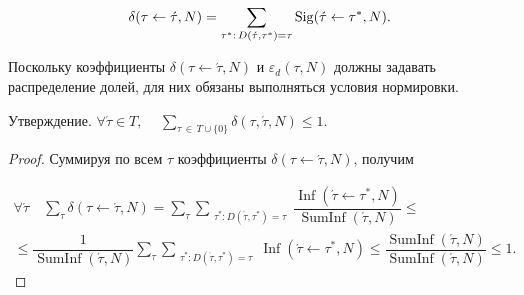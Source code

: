\begin{equation} \label{nazarov:coarse:delta_eq13}

	\delta(\tau\leftarrow\acute{\tau},N) = \sum_{\tau^{*}: \, D(\acute{\tau},\tau^{*})=\tau}  \mathop{\rm Sig}(\acute{\tau} \leftarrow \tau^{*},N).

\end{equation}

%

Поскольку коэффициенты $\delta(\tau\leftarrow\acute{\tau},N)$  и $\varepsilon_{d}(\tau,N)$ должны задавать распределение долей, для них обязаны выполняться условия нормировки. 



\smallskip



{\small\sc Утверждение.} $\forall \acute{\tau} \in T, \, \quad \sum\limits_{\tau \, \in \, T \cup \lbrace  0 \rbrace } \delta(\tau,\acute{\tau},N) \leq 1$.



\smallskip



\begin{proof}

  Суммируя по всем $\tau$  коэффициенты $\delta(\tau\leftarrow\acute{\tau},N)$,   получим

\begin{multline}

  \forall \acute{\tau} \quad

   \sum_{\tau} \delta(\tau\leftarrow\acute{\tau},N)  =

   \sum_{\tau}  \sum_{\substack{\tau^{*}: D(\acute{\tau},\tau^{*})=\tau}} 

\dfrac{\operatorname{Inf}(\acute{\tau} \leftarrow \tau^{*},N)}{\operatorname{SumInf}(\acute{\tau},N)  } \leq \\ 

\leq \dfrac{1}{\operatorname{SumInf}(\acute{\tau},N)}   

   \sum_{\tau}  \sum_{\substack{\tau^{*}: D(\acute{\tau},\tau^{*})=\tau}} \operatorname{Inf}(\acute{\tau} \leftarrow \tau^{*},N)  \leq \dfrac{\operatorname{SumInf}(\acute{\tau},N)}{\operatorname{SumInf}(\acute{\tau},N)} \leq 1.    

\end{multline}



\vspace{-5mm}



\hfill \end{proof}



